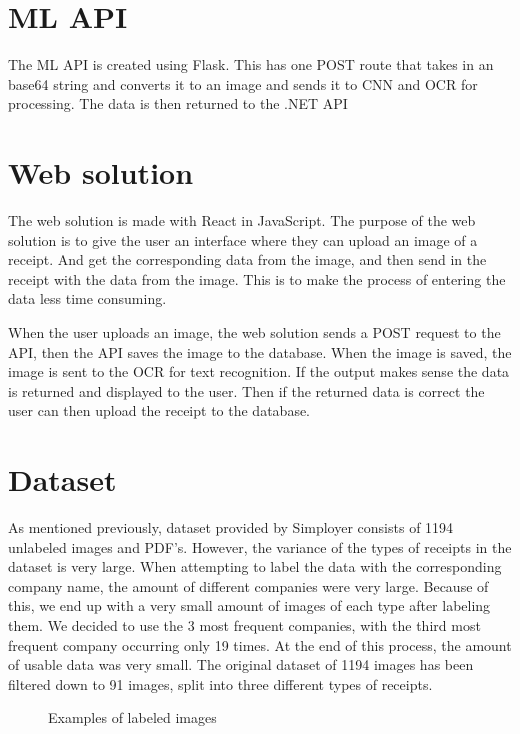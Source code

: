 \section{ML API}\label{sec:ML API ch4}
The ML API is created using Flask.
This has one POST route that takes in an base64 string and converts it to an image and sends it to CNN and OCR for
processing.
The data is then returned to the .NET API

\section{Web solution}\label{sec:Web solution}

The web solution is made with React in JavaScript.
The purpose of the web solution is to give the user an interface where they can upload an image of a receipt.
And get the corresponding data from the image, and then send in the receipt with the data from the image.
This is to make the process of entering the data less time consuming.

When the user uploads an image, the web solution sends a POST request to the API, then the API saves the image to
the database.
When the image is saved, the image is sent to the OCR for text recognition.
If the output makes sense the data is returned and displayed to the user.
Then if the returned data is correct the user can then upload the receipt to the database.

\section{Dataset}\label{sec:dataset2}

As mentioned previously, dataset provided by Simployer consists of 1194 unlabeled images and PDF's.
However, the variance of the types of receipts in the dataset is very large.
When attempting to label the data with the corresponding company name, the amount of different companies were very large.
Because of this, we end up with a very small amount of images of each type after labeling them.
We decided to use the 3 most frequent companies, with the third most frequent company occurring only 19 times.
At the end of this process, the amount of usable data was very small.
The original dataset of 1194 images has been filtered down to 91 images, split into three different types of receipts.

\begin{figure}[h]
    \caption{Examples of labeled images}
    \label{fig:figure4.1}
\end{figure}

